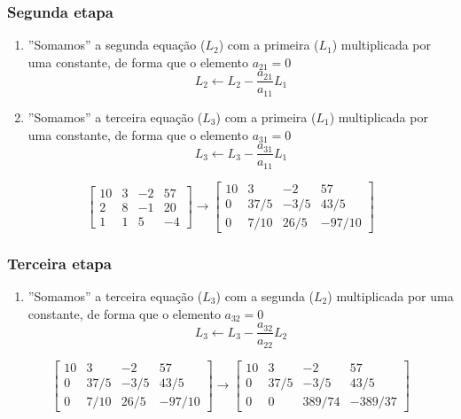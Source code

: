 \begin{frame}
    \frametitle{Segunda etapa}

    \begin{enumerate}
        \item ''Somamos'' a segunda equação (\(L_2\)) com a primeira (\(L_1\)) multiplicada por uma constante, de forma que o elemento \(a_{21} = 0\)
            \[
                L_2 \leftarrow L_2 - \frac{a_{21}}{a_{11}} L_1
            \] 
        \item ''Somamos'' a terceira equação (\(L_3\)) com a primeira (\(L_1\)) multiplicada por uma constante, de forma que o elemento \(a_{31} = 0\)
            \[
                L_3 \leftarrow L_3 - \frac{a_{31}}{a_{11}} L_1
            \] 
    \end{enumerate}
    \[
        \left[
            \begin{array}{ccc|c}
                10 & 3 & -2 & 57 \\ 2 & 8 & -1 & 20 \\ 1 & 1 & 5 & -4
            \end{array}
        \right]
        \rightarrow
        \left[
            \begin{array}{ccc|c}
                10 & 3 & -2 & 57 \\ 0 & 37/5 & -3/5 & 43/5 \\ 0 & 7/10 & 26/5 & -97/10
            \end{array}
        \right]
    \]
\end{frame}

\begin{frame}
    \frametitle{Terceira etapa}
    \begin{enumerate}
        \item ''Somamos'' a terceira equação (\(L_3\)) com a segunda (\(L_2\)) multiplicada por uma constante, de forma que o elemento \(a_{32} = 0\)
            \[
                L_3 \leftarrow L_3 - \frac{a_{32}}{a_{22}} L_2
            \] 
    \end{enumerate}
    \[
        \left[
            \begin{array}{ccc|c}
                10 & 3 & -2 & 57 \\ 0 & 37/5 & -3/5 & 43/5 \\ 0 & 7/10 & 26/5 & -97/10
            \end{array}
        \right]
        \rightarrow
        \left[
            \begin{array}{ccc|c}
                10 & 3 & -2 & 57 \\ 0 & 37/5 & -3/5 & 43/5 \\ 0 & 0 & 389/74 & -389/37
            \end{array}
        \right]
    \]
\end{frame}

